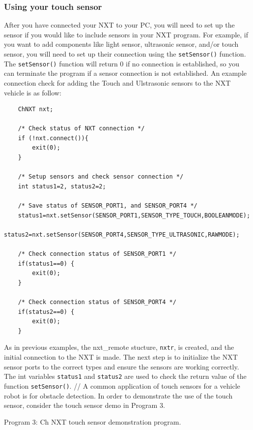 \subsubsection{Using your touch sensor}
After you have connected your NXT to your PC, you will need to set up the sensor if you would like to include 
sensors in your NXT program. For example, if you want to add components like light sensor, ultrasonic sensor, 
and/or touch sensor, you will need to set up their connection using the \verb+setSensor()+ function. 
The \verb+setSensor()+ function will return 0 if no connection is established, so you can terminate the 
program if a sensor connection is not established. An example connection check for adding the Touch and 
Ulstrasonic sensors to the NXT vehicle is as follow:
\begin{verbatim}
    ChNXT nxt;

    /* Check status of NXT connection */
    if (!nxt.connect()){
        exit(0);
    }
    
    /* Setup sensors and check sensor connection */
    int status1=2, status2=2;

    /* Save status of SENSOR_PORT1, and SENSOR_PORT4 */
    status1=nxt.setSensor(SENSOR_PORT1,SENSOR_TYPE_TOUCH,BOOLEANMODE);
    status2=nxt.setSensor(SENSOR_PORT4,SENSOR_TYPE_ULTRASONIC,RAWMODE);
    
    /* Check connection status of SENSOR_PORT1 */
    if(status1==0) {
        exit(0);
    }
    
    /* Check connection status of SENSOR_PORT4 */
    if(status2==0) {
        exit(0);
    }
\end{verbatim}
As in previous examples, the nxt\_remote stucture, \verb+nxtr+, is created, and the initial connection 
to the NXT is made. The next step is to initialize the NXT sensor ports to the correct types and ensure 
the sensors are working correctly.  The int variables \verb+status1+ and \verb+status2+ are used to 
check the return value of the function \verb+setSensor()+.
//
A common application of touch sensors for a vehicle robot is for obstacle detection. In order to 
demonstrate the use of the touch sensor, consider the touch sensor demo in Program 3.


\begin{center}
Program 3: Ch NXT touch sensor demonstration program.
\end{center}

